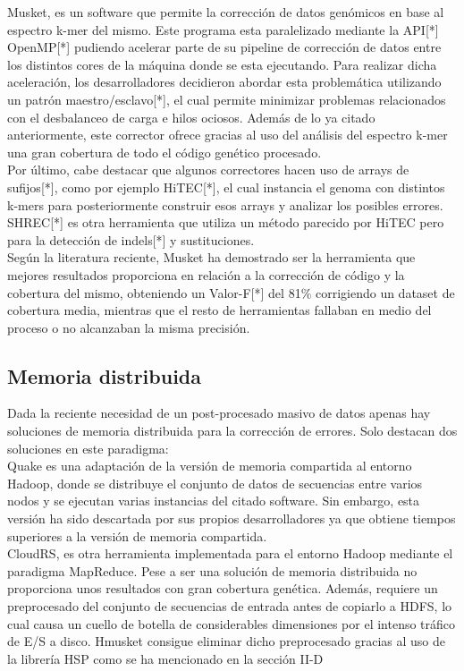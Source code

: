 \documentclass[conference]{IEEEtran}
\begin{document}
Musket\cite{musket}, es un software que permite la corrección de datos genómicos en base al espectro k-mer del mismo. Este programa esta paralelizado mediante la API[*] OpenMP[*] pudiendo acelerar parte de su pipeline de corrección de datos entre los distintos cores de la máquina donde se esta ejecutando. Para realizar dicha aceleración, los desarrolladores decidieron abordar esta problemática utilizando un patrón maestro/esclavo[*], el cual permite minimizar problemas relacionados con el desbalanceo de carga e hilos ociosos. Además de lo ya citado anteriormente, este corrector ofrece gracias al uso del análisis del espectro k-mer una gran cobertura de todo el código genético procesado.\\


Por último, cabe destacar que algunos correctores hacen uso de arrays de sufijos[*], como por ejemplo HiTEC[*], el cual instancia el genoma con distintos k-mers para posteriormente construir esos arrays y analizar los posibles errores. SHREC[*] es otra herramienta que utiliza un método parecido por HiTEC pero para la detección de indels[*] y sustituciones.\\

Según la literatura reciente\cite{comparative}, Musket ha demostrado ser la herramienta que mejores resultados proporciona en relación a la corrección de código y la cobertura del mismo, obteniendo un Valor-F[*] del 81\% corrigiendo un dataset de cobertura media, mientras que el resto de herramientas fallaban en medio del proceso o no alcanzaban la misma precisión.

\subsection{Memoria distribuida}
Dada la reciente necesidad de un post-procesado masivo de datos apenas hay soluciones de memoria distribuida para la corrección de errores. Solo destacan dos soluciones en este paradigma:\\

Quake es una adaptación de la versión de memoria compartida al entorno Hadoop, donde se distribuye el conjunto de datos de secuencias entre varios nodos y se ejecutan varias instancias del citado software. Sin embargo, esta versión ha sido descartada por sus propios desarrolladores ya que obtiene tiempos superiores a la versión de memoria compartida.\\

CloudRS\cite{cloudrs}, es otra herramienta implementada para el entorno Hadoop mediante el paradigma MapReduce. Pese a ser una solución de memoria distribuida no proporciona unos resultados con gran cobertura genética. Además, requiere un preprocesado del conjunto de secuencias de entrada antes de copiarlo a HDFS, lo cual causa un cuello de botella de considerables dimensiones por el intenso tráfico de E/S a disco. Hmusket consigue eliminar dicho preprocesado gracias al uso de la librería HSP como se ha mencionado en la sección II-D\\
\end{document}
